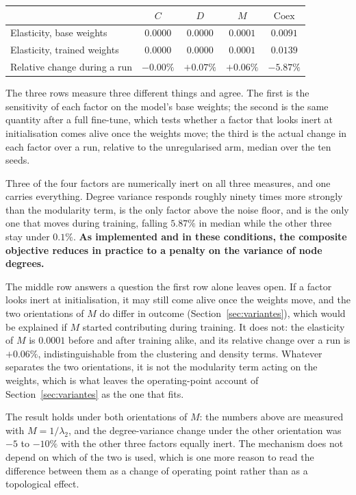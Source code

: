 \documentclass[11pt,a4paper]{article}
\begin{document}
\begin{center}
\small
\begin{tabular}{lcccc}
\hline
& $C$ & $D$ & $M$ & $\mathrm{Coex}$ \\
\hline
Elasticity, base weights & $0.0000$ & $0.0000$ & $0.0001$ & $\mathbf{0.0091}$ \\
Elasticity, trained weights & $0.0000$ & $0.0000$ & $0.0001$ & $\mathbf{0.0139}$ \\
Relative change during a run & $-0.00\%$ & $+0.07\%$ & $+0.06\%$ & $\mathbf{-5.87\%}$ \\
\hline
\end{tabular}
\end{center}

\noindent The three rows measure three different things and agree. The first is
the sensitivity of each factor on the model's base weights; the second is the
same quantity after a full fine-tune, which tests whether a factor that looks
inert at initialisation comes alive once the weights move; the third is the
actual change in each factor over a run, relative to the unregularised arm,
median over the ten seeds.

Three of the four factors are numerically inert on all three measures, and one
carries everything. Degree variance responds roughly ninety times more strongly
than the modularity term, is the only factor above the noise floor, and is the
only one that moves during training, falling $5.87\%$ in median while the other
three stay under $0.1\%$. \textbf{As implemented and in these conditions, the
composite objective reduces in practice to a penalty on the variance of node
degrees.}

The middle row answers a question the first row alone leaves open. If a factor
looks inert at initialisation, it may still come alive once the weights move,
and the two orientations of $M$ do differ in outcome
(Section~\ref{sec:variantes}), which would be explained if $M$ started
contributing during training. It does not: the elasticity of $M$ is $0.0001$
before and after training alike, and its relative change over a run is
$+0.06\%$, indistinguishable from the clustering and density terms. Whatever
separates the two orientations, it is not the modularity term acting on the
weights, which is what leaves the operating-point account of
Section~\ref{sec:variantes} as the one that fits.

The result holds under both orientations of $M$: the numbers above are measured
with $M = 1/\lambda_2$, and the degree-variance change under the other
orientation was $-5$ to $-10\%$ with the other three factors equally inert. The
mechanism does not depend on which of the two is used, which is one more reason
to read the difference between them as a change of operating point rather than
as a topological effect.
\end{document}
